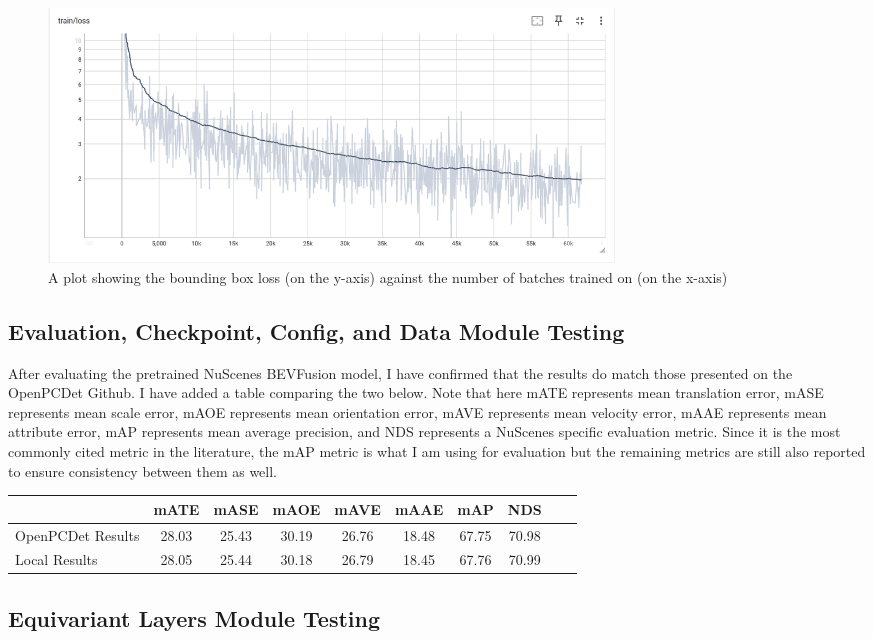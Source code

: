 \documentclass[12pt, titlepage]{article}
\begin{document}
\begin{figure}[h]
\includegraphics[width=15cm]{loss}
\caption{A plot showing the bounding box loss (on the y-axis) against the number of batches trained on (on the x-axis)}
\label{Fig:Loss}  
\end{figure}


\subsection{Evaluation, Checkpoint, Config, and Data Module Testing}

After evaluating the pretrained NuScenes BEVFusion model, I have confirmed that the results do match those presented on the OpenPCDet Github. I have added a table comparing the two below. 
Note that here mATE represents mean translation error, mASE represents mean scale error, mAOE represents mean orientation error, mAVE represents mean velocity error, mAAE represents mean attribute error, mAP represents 
mean average precision, and NDS represents a NuScenes specific evaluation metric. Since it is the most commonly cited metric in the literature, the mAP metric is what I am using for evaluation but 
the remaining metrics are still also reported to ensure consistency between them as well. 
\newline


\begin{tabular}{lccccccccl}\toprule
  & mATE & mASE & mAOE & mAVE & mAAE & mAP & NDS \\\midrule
  OpenPCDet Results & 28.03 & 25.43 & 30.19 & 26.76 & 18.48 & 67.75 & 70.98 \\
  \addlinespace
  Local Results & 28.05 & 25.44 & 30.18 & 26.79 & 18.45 & 67.76 & 70.99 \\
  \bottomrule
\end{tabular}

\subsection{Equivariant Layers Module Testing}
\end{document}
